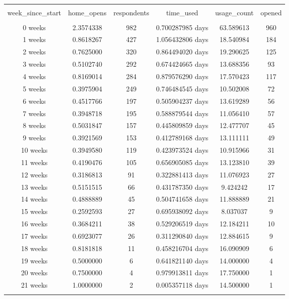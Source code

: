 
\begin{table}[!htbp] \centering 
  \caption{} 
  \label{tbl:weekly_aggregates} 
\begin{tabular}{@{\extracolsep{5pt}} cccccc} 
\\[-1.8ex]\hline 
\hline \\[-1.8ex] 
week\_since\_start & home\_opens & respondents & time\_used & usage\_count & opened \\ 
\hline \\[-1.8ex] 
 0 weeks & 2.3574338 & 982 & 0.700287985 days & 63.589613 & 960 \\ 
 1 weeks & 0.8618267 & 427 & 1.056432806 days & 18.540984 & 184 \\ 
 2 weeks & 0.7625000 & 320 & 0.864494020 days & 19.290625 & 125 \\ 
 3 weeks & 0.5102740 & 292 & 0.674424665 days & 13.688356 &  93 \\ 
 4 weeks & 0.8169014 & 284 & 0.879576290 days & 17.570423 & 117 \\ 
 5 weeks & 0.3975904 & 249 & 0.746484545 days & 10.502008 &  72 \\ 
 6 weeks & 0.4517766 & 197 & 0.505904237 days & 13.619289 &  56 \\ 
 7 weeks & 0.3948718 & 195 & 0.588879544 days & 11.056410 &  57 \\ 
 8 weeks & 0.5031847 & 157 & 0.445809859 days & 12.477707 &  45 \\ 
 9 weeks & 0.3921569 & 153 & 0.412789168 days & 13.111111 &  49 \\ 
10 weeks & 0.3949580 & 119 & 0.423973524 days & 10.915966 &  31 \\ 
11 weeks & 0.4190476 & 105 & 0.656905085 days & 13.123810 &  39 \\ 
12 weeks & 0.3186813 &  91 & 0.322881413 days & 11.076923 &  27 \\ 
13 weeks & 0.5151515 &  66 & 0.431787350 days &  9.424242 &  17 \\ 
14 weeks & 0.4888889 &  45 & 0.504741658 days & 11.888889 &  21 \\ 
15 weeks & 0.2592593 &  27 & 0.695938092 days &  8.037037 &   9 \\ 
16 weeks & 0.3684211 &  38 & 0.529206519 days & 12.184211 &  10 \\ 
17 weeks & 0.6923077 &  26 & 0.311290840 days & 12.884615 &   9 \\ 
18 weeks & 0.8181818 &  11 & 0.458216704 days & 16.090909 &   6 \\ 
19 weeks & 0.5000000 &   6 & 0.641821140 days & 14.000000 &   4 \\ 
20 weeks & 0.7500000 &   4 & 0.979913811 days & 17.750000 &   1 \\ 
21 weeks & 1.0000000 &   2 & 0.005357118 days & 14.500000 &   1 \\ 
\hline \\[-1.8ex] 
\end{tabular} 
\end{table} 
